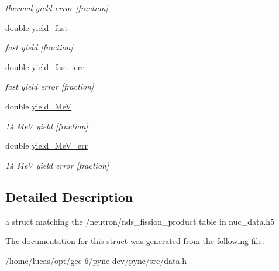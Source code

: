 \begin{DoxyCompactItemize}
\begin{DoxyCompactList}\small\item\em thermal yield error \mbox{[}fraction\mbox{]} \end{DoxyCompactList}\item 
double \hyperlink{structpyne_1_1ndsfpy_ae890b10d182d771d0837b24818040a25}{yield\+\_\+fast}\hypertarget{structpyne_1_1ndsfpy_ae890b10d182d771d0837b24818040a25}{}\label{structpyne_1_1ndsfpy_ae890b10d182d771d0837b24818040a25}

\begin{DoxyCompactList}\small\item\em fast yield \mbox{[}fraction\mbox{]} \end{DoxyCompactList}\item 
double \hyperlink{structpyne_1_1ndsfpy_a0e2478bc6cbf2317861727a88cb8370b}{yield\+\_\+fast\+\_\+err}\hypertarget{structpyne_1_1ndsfpy_a0e2478bc6cbf2317861727a88cb8370b}{}\label{structpyne_1_1ndsfpy_a0e2478bc6cbf2317861727a88cb8370b}

\begin{DoxyCompactList}\small\item\em fast yield error \mbox{[}fraction\mbox{]} \end{DoxyCompactList}\item 
double \hyperlink{structpyne_1_1ndsfpy_a5e67e99b97b5ca511ca39c6dcd4b186e}{yield\+\_\+MeV}\hypertarget{structpyne_1_1ndsfpy_a5e67e99b97b5ca511ca39c6dcd4b186e}{}\label{structpyne_1_1ndsfpy_a5e67e99b97b5ca511ca39c6dcd4b186e}

\begin{DoxyCompactList}\small\item\em 14 MeV yield \mbox{[}fraction\mbox{]} \end{DoxyCompactList}\item 
double \hyperlink{structpyne_1_1ndsfpy_a1d24f4162fe242108b8032f76171d7e5}{yield\+\_\+Me\+V\+\_\+err}\hypertarget{structpyne_1_1ndsfpy_a1d24f4162fe242108b8032f76171d7e5}{}\label{structpyne_1_1ndsfpy_a1d24f4162fe242108b8032f76171d7e5}

\begin{DoxyCompactList}\small\item\em 14 MeV yield error \mbox{[}fraction\mbox{]} \end{DoxyCompactList}\end{DoxyCompactItemize}


\subsection{Detailed Description}
a struct matching the \textquotesingle{}/neutron/nds\+\_\+fission\+\_\+product\textquotesingle{} table in nuc\+\_\+data.\+h5 

The documentation for this struct was generated from the following file\+:\begin{DoxyCompactItemize}
\item 
/home/lucas/opt/gcc-\/6/pyne-\/dev/pyne/src/\hyperlink{data_8h}{data.\+h}\end{DoxyCompactItemize}
